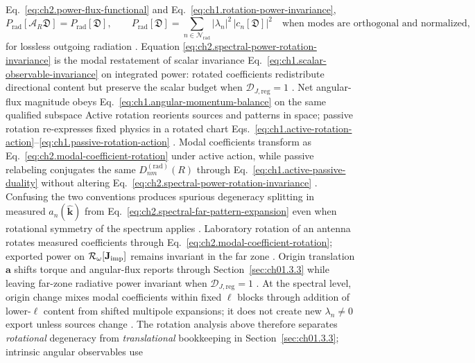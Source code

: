 Eq.~\eqref{eq:ch2.power-flux-functional} and
Eq.~\eqref{eq:ch1.rotation-power-invariance},
\begin{equation}
\label{eq:ch2.spectral-power-rotation-invariance}
P_{\mathrm{rad}}[\mathcal{A}_R\mathfrak{D}]
=
P_{\mathrm{rad}}[\mathfrak{D}],
\qquad
P_{\mathrm{rad}}[\mathfrak{D}]
=
\sum_{n\in\mathcal{N}_{\mathrm{rad}}}
|\lambda_n|^{2}\,|c_n[\mathfrak{D}]|^{2}
\quad\text{when modes are orthogonal and normalized,}
\end{equation}
for lossless outgoing radiation \cite{stratton1941}. Equation
\eqref{eq:ch2.spectral-power-rotation-invariance} is the modal restatement of scalar
invariance Eq.~\eqref{eq:ch1.scalar-observable-invariance} on integrated power: rotated
coefficients redistribute directional content but preserve the scalar budget when
\(\mathcal{D}_{J,\mathrm{reg}}=1\) \cite{stratton1941}. Net angular-flux magnitude obeys
Eq.~\eqref{eq:ch1.angular-momentum-balance} on the same qualified subspace
Active rotation reorients sources and patterns in space; passive rotation re-expresses
fixed physics in a rotated chart Eqs.~\eqref{eq:ch1.active-rotation-action}--\eqref{eq:ch1.passive-rotation-action}
\cite{stratton1941}. Modal coefficients transform as
Eq.~\eqref{eq:ch2.modal-coefficient-rotation} under active action, while passive
relabeling conjugates the same \(D^{(\mathrm{rad})}_{nm}(R)\) through
Eq.~\eqref{eq:ch1.active-passive-duality} without altering
Eq.~\eqref{eq:ch2.spectral-power-rotation-invariance} \cite{stratton1941}.
Confusing the two conventions produces spurious degeneracy splitting in measured
\(a_n(\hat{\mathbf{k}})\) from Eq.~\eqref{eq:ch2.spectral-far-pattern-expansion} even when
rotational symmetry of the spectrum applies \cite{stratton1941}. Laboratory
rotation of an antenna rotates measured coefficients through
Eq.~\eqref{eq:ch2.modal-coefficient-rotation}; exported power on
\(\mathcal{R}_\omega[\mathbf{J}_{\mathrm{imp}}]\) remains invariant in the far zone
\cite{harrington2001}. Origin translation \(\mathbf{a}\) shifts torque and angular-flux reports through
Section~\ref{sec:ch01.3.3} while leaving far-zone radiative power invariant when
\(\mathcal{D}_{J,\mathrm{reg}}=1\) \cite{stratton1941}. At the spectral level, origin
change mixes modal coefficients within fixed \(\ell\) blocks through addition of
lower-\(\ell\) content from shifted multipole expansions; it does not create new
\(\lambda_n\neq 0\) export unless sources change \cite{jackson1999}.
The rotation analysis above therefore separates \emph{rotational} degeneracy from
\emph{translational} bookkeeping in Section~\ref{sec:ch01.3.3}; intrinsic angular observables use
